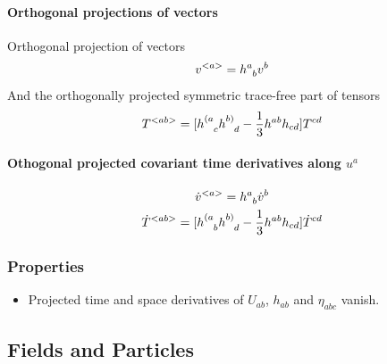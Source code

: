 \documentclass[letterpaper,10pt,english]{sphinxmanual}
\begin{document}
\paragraph{Orthogonal projections of vectors}
\label{relativity/GeneralRelativity:orthogonal-projections-of-vectors}
Orthogonal projection of vectors
\begin{gather}
\begin{split}v^{<a>}      = h^a_{\phantom a b} v^b\end{split}\notag
\end{gather}
And the orthogonally projected symmetric trace-free part of tensors
\begin{gather}
\begin{split}T^{<ab>} = [h^{(a}_{\phantom {(a} c} h^{b)}_{\phantom{b)}d} - \frac{1}{3} h^{ab} h_{cd} ] T^{cd}\end{split}\notag
\end{gather}

\paragraph{Othogonal projected covariant time derivatives along \(u^a\)}
\label{relativity/GeneralRelativity:othogonal-projected-covariant-time-derivatives-along}\begin{gather}
\begin{split}\dot v^{<a>} = h^a_{\phantom a b} \dot v^b\end{split}\notag\\\begin{split}\dot T^{<ab>} = [ h^{(a}_{\phantom{(a}b} h^{b)}_{\phantom{b)} d} - \frac 1 3 h^{ab}h_{cd} ]\dot T^{cd}\end{split}\notag
\end{gather}

\subsubsection{Properties}
\label{relativity/GeneralRelativity:properties}\begin{itemize}
\item {} 
Projected time and space derivatives of \(U_{ab}\), \(h_{ab}\) and \(\eta_{abc}\) vanish.

\end{itemize}


\subsection{Fields and Particles}
\label{relativity/GeneralRelativity:fields-and-particles}
\end{document}
